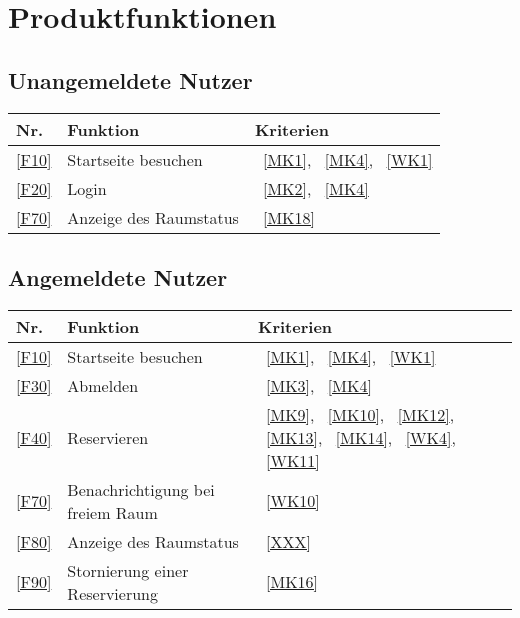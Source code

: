 

\chapter{Produktfunktionen}
\label{chap:product_functions}

\section{Unangemeldete Nutzer}\label{sec:unangemeldete-benutzer-funktionen}
\begin{table}[htbp]
    \centering
    \begin{tabularx}{\textwidth}{ l|X|l }
        \textbf{Nr.} & \textbf{Funktion} & \textbf{Kriterien} \\ \hline\hline
        \ref{F10} & Startseite besuchen &~\ref{MK1}, ~\ref{MK4}, ~\ref{WK1} \\
        \ref{F20} & Login &~\ref{MK2}, ~\ref{MK4} \\
        \ref{F70} & Anzeige des Raumstatus &~\ref{MK18} \\
    \end{tabularx}
    \label{tab:non_loggedin_functions}
\end{table}

\section{Angemeldete Nutzer}\label{sec:angemeldete-benutzer-funktionen}
\begin{table}[htbp]
    \centering
    \begin{tabularx}{\textwidth}{ l|X|l }
        \textbf{Nr.} & \textbf{Funktion} & \textbf{Kriterien} \\ \hline\hline
        \ref{F10} & Startseite besuchen &~\ref{MK1}, ~\ref{MK4}, ~\ref{WK1} \\
        \ref{F30} & Abmelden &~\ref{MK3}, ~\ref{MK4} \\
        \ref{F40} & Reservieren &~\ref{MK9}, ~\ref{MK10}, ~\ref{MK12}, ~\ref{MK13}, ~\ref{MK14}, ~\ref{WK4}, ~\ref{WK11} \\
        \ref{F70} & Benachrichtigung bei freiem Raum &~\ref{WK10} \\
        \ref{F80} & Anzeige des Raumstatus &~\ref{XXX} \\
        \ref{F90} & Stornierung einer Reservierung &~\ref{MK16} \\
    \end{tabularx}
    \label{tab:loggedin_functions}
\end{table}
\newpage
